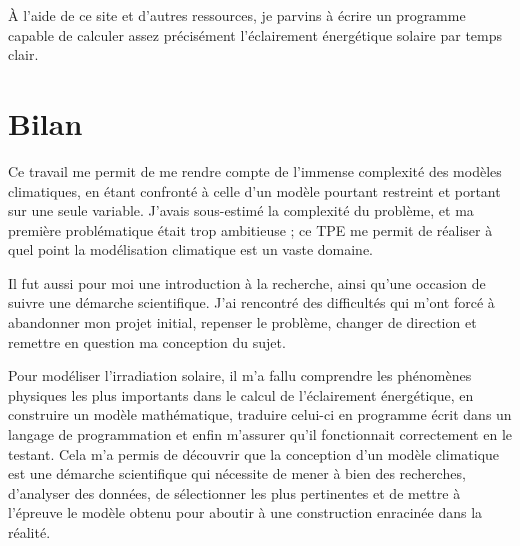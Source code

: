 \documentclass[12pt,a4paper]{article}
\begin{document}
À l'aide de ce site et d'autres ressources, je parvins à écrire un programme capable de calculer assez précisément l'éclairement énergétique solaire par temps clair.


\section{Bilan}
Ce travail me permit de me rendre compte de l'immense complexité des modèles climatiques, en étant confronté à celle d'un modèle pourtant restreint et portant sur une seule variable.
J'avais sous-estimé la complexité du problème, et ma première problématique était trop ambitieuse ; ce TPE me permit de réaliser à quel point la modélisation climatique est un vaste domaine.

Il fut aussi pour moi une introduction à la recherche, ainsi qu'une occasion de suivre une démarche scientifique.
J'ai rencontré des difficultés qui m'ont forcé à abandonner mon projet initial, repenser le problème, changer de direction et remettre en question ma conception du sujet.

Pour modéliser l'irradiation solaire, il m'a fallu comprendre les phénomènes physiques les plus importants dans le calcul de l'éclairement énergétique, en construire un modèle mathématique, traduire celui-ci en programme écrit dans un langage de programmation et enfin m'assurer qu'il fonctionnait correctement en le testant.
Cela m'a permis de découvrir que la conception d'un modèle climatique est une démarche scientifique qui nécessite de mener à bien des recherches, d'analyser des données, de sélectionner les plus pertinentes et de mettre à l'épreuve le modèle obtenu pour aboutir à une construction enracinée dans la réalité.
\end{document}
